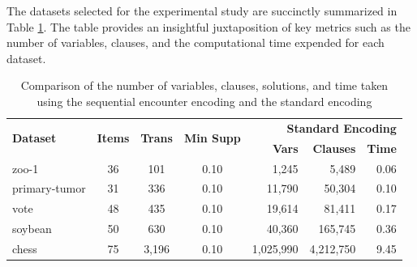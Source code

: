 The datasets selected for the experimental study are succinctly summarized
in Table \ref{tab:result_benchmark_real_datasets}.
The table provides an insightful juxtaposition of key metrics such as the number of variables,
clauses, and the computational time expended for each dataset.

\begin{table}[H]
    \centering
    \caption{Comparison of the number of variables, clauses, solutions, and time taken using the sequential encounter encoding and the standard encoding}
    \label{tab:result_benchmark_real_datasets}
    \begin{tabular}{|l|c|c|c|r|r|r|}
        \hline
        \multirow{2}{*}{\textbf{Dataset}} & \multirow{2}{*}{\textbf{Items}} & \multirow{2}{*}{\textbf{Trans}} & \multirow{2}{*}{\textbf{Min Supp}} & \multicolumn{3}{r|}{\textbf{Standard Encoding}}                                    \\ \cline{5-7}
                                          &                                 &                                 &                                    & \textbf{Vars}                                   & \textbf{Clauses} & \textbf{Time} \\ \hline
        zoo-1                             & 36                              & 101                             & 0.10                               & 1,245                                           & 5,489            & 0.06          \\
        primary-tumor                     & 31                              & 336                             & 0.10                               & 11,790                                          & 50,304           & 0.10          \\
        vote                              & 48                              & 435                             & 0.10                               & 19,614                                          & 81,411           & 0.17          \\
        soybean                           & 50                              & 630                             & 0.10                               & 40,360                                          & 165,745          & 0.36          \\
        chess                             & 75                              & 3,196                           & 0.10                               & 1,025,990                                       & 4,212,750        & 9.45          \\

\end{tabular}
\end{table}
